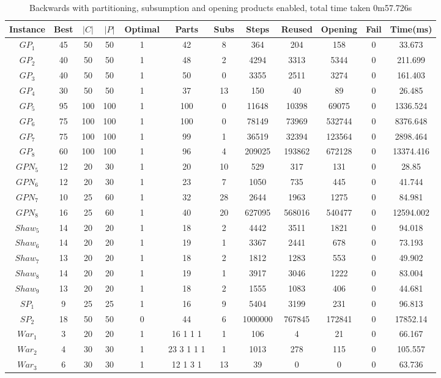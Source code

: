 \begin{table}[H]
\begin{tabular}{|c|c|c|c|c|c|c|c|c|c|c|c|} \hline
Instance&Best&$|C|$&$|P|$&Optimal&Parts&Subs&Steps&Reused&Opening&Fail&Time(ms) \\\hline
$GP_1$&45&50&50&1&42 &8&364&204&158&0&33.673\\ 
$GP_2$&40&50&50&1&48 &2&4294&3313&5344&0&211.699\\ 
$GP_3$&40&50&50&1&50 &0&3355&2511&3274&0&161.403\\ 
$GP_4$&30&50&50&1&37 &13&150&40&89&0&26.485\\ 
$GP_5$&95&100&100&1&100 &0&11648&10398&69075&0&1336.524\\ 
$GP_6$&75&100&100&1&100 &0&78149&73969&532744&0&8376.648\\ 
$GP_7$&75&100&100&1&99 &1&36519&32394&123564&0&2898.464\\ 
$GP_8$&60&100&100&1&96 &4&209025&193862&672128&0&13374.416\\ 
$GPN_5$&12&20&30&1&20 &10&529&317&131&0&28.85\\ 
$GPN_6$&12&20&30&1&23 &7&1050&735&445&0&41.744\\ 
$GPN_7$&10&25&60&1&32 &28&2644&1963&1275&0&84.981\\ 
$GPN_8$&16&25&60&1&40 &20&627095&568016&540477&0&12594.002\\ 
$Shaw_5$&14&20&20&1&18 &2&4442&3511&1821&0&94.018\\ 
$Shaw_6$&14&20&20&1&19 &1&3367&2441&678&0&73.193\\ 
$Shaw_7$&13&20&20&1&18 &2&1812&1283&553&0&49.902\\ 
$Shaw_8$&14&20&20&1&19 &1&3917&3046&1222&0&83.004\\ 
$Shaw_9$&13&20&20&1&18 &2&1555&1083&406&0&44.681\\ 
$SP_1$&9&25&25&1&16 &9&5404&3199&231&0&96.813\\ 
$SP_2$&18&50&50&0&44 &6&1000000&767845&172841&0&17852.14\\ 
$War_1$&3&20&20&1&16 1 1 1 &1&106&4&21&0&66.167\\ 
$War_2$&4&30&30&1&23 3 1 1 1 &1&1013&278&115&0&105.557\\ 
$War_3$&6&30&30&1&12 1 3 1 &13&39&0&0&0&63.736\\ 
\hline
\end{tabular} \caption{ Backwards with partitioning, subsumption and opening
products enabled, total time taken  0m57.726s } \end{table}

